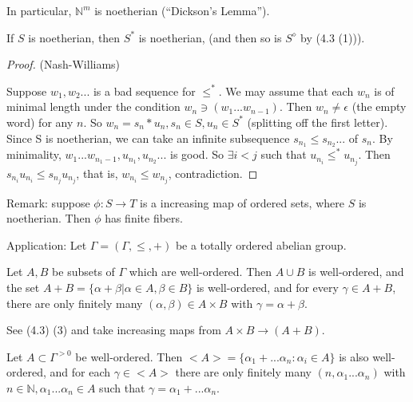 In particular, $\mathbb{N}^m$ is noetherian (``Dickson's Lemma'').
\begin{theorem} %
If $S$ is noetherian, then $S^*$ is noetherian, (and then so is $S^\diamond$ by (4.3 (1))).
 \end{theorem}

\begin{proof}  %
 
 (Nash-Williams)

Suppose $w_1, w_2...$ is a bad sequence for $\leq^*$. We may assume that each $w_n$ is of minimal length under the condition $w_n \ni (w_1...w_{n-1})$. Then $w_n \neq \epsilon$ (the empty word) for any $n$. So $w_n=s_{n}*u_{n}, s_n \in S, u_n  \in S^*$ (splitting off the first letter). Since S is noetherian, we can take an infinite subsequence $s_{n_1} \leq s_{n_2}...$ of $s_n$. By minimality, $w_1...w_{n_{1}-1}, u_{n_1}, u_{n_2}...$ is good. So $\exists i<j$ such that $u_{n_i} \leq^* u_{n_j}$. Then $s_{n_i}u_{n_i} \leq s_{n_j}u_{n_j}$, that is, $w_{n_i} \leq w_{n_j}$, contradiction.
\end{proof}

Remark: suppose $\phi: S \rightarrow T$ is a  increasing map of ordered sets, where $S$ is noetherian. Then $\phi$ has finite fibers.

Application: Let $\Gamma=(\Gamma, \leq, +)$ be a totally ordered abelian group.

\begin{corollary} %
Let $A, B$ be subsets of $\Gamma$ which are well-ordered. Then $A \cup B$ is well-ordered, and the set $A+B=\{\alpha + \beta | \alpha \in A, \beta \in B\}$ is well-ordered, and for every $\gamma \in A+B$, there are only finitely many $(\alpha, \beta) \in A \times B$ with $\gamma = \alpha + \beta$.
 \end{corollary}

See (4.3) (3) and take increasing maps from $A \times B \rightarrow (A+B)$.

\begin{corollary} %
Let $A \subset \Gamma^{>0}$ be well-ordered. Then $<A>=\{\alpha_1+...\alpha_n: \alpha_i \in A\}$ is also well-ordered, and for each $\gamma \in <A>$ there are only finitely many $(n, \alpha_1...\alpha_n)$ with $n \in \mathbb{N}, \alpha_1...\alpha_n \in A$ such that $\gamma=\alpha_1+...\alpha_n$.
 \end{corollary}

